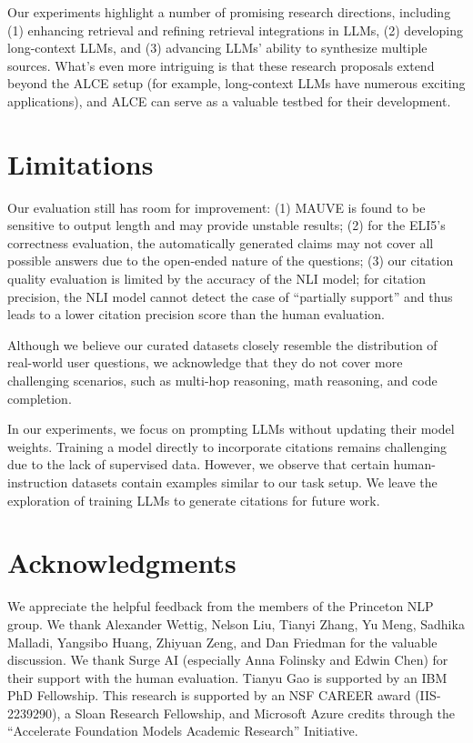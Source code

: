 \documentclass[11pt]{article}
\newcommand{\citeeval}{ALCE}
\begin{document}
Our experiments highlight a number of promising research directions, including
(1) enhancing retrieval and refining retrieval integrations in LLMs,
(2) developing long-context LLMs, and 
(3) advancing LLMs' ability to synthesize multiple sources.
What's even more intriguing is that  these research proposals extend beyond the \citeeval{} setup (for example, long-context LLMs have numerous exciting applications), and
\citeeval{} can serve as a valuable testbed for their development.


\section*{Limitations}

 

Our evaluation still has room for improvement:
(1) MAUVE is found to be sensitive to output length and may provide unstable results;
(2) for the ELI5's correctness evaluation, the automatically generated claims may not cover all possible answers due to the open-ended nature of the questions;
(3) our citation quality evaluation is limited by the accuracy of the NLI model; for citation precision, the NLI model cannot detect the case of ``partially support'' and thus
leads to a lower citation precision score than the human evaluation.

Although we believe our curated datasets closely resemble the distribution of real-world user questions,
we acknowledge that they do not cover more challenging scenarios, such as
multi-hop reasoning, math reasoning, and code completion.


In our experiments, we focus on prompting LLMs without updating their model weights.
Training a model directly to incorporate citations remains challenging due to the lack of supervised data.
However, we observe that certain human-instruction datasets
contain examples similar to our task setup.
We leave the exploration of training LLMs to generate citations for future work.



\section*{Acknowledgments}

We appreciate the helpful feedback from the members of the Princeton NLP group. %
We thank Alexander Wettig, Nelson Liu, Tianyi Zhang, Yu Meng, Sadhika Malladi, Yangsibo Huang, Zhiyuan Zeng, and Dan  Friedman for the valuable discussion.
We thank Surge AI (especially Anna Folinsky and Edwin Chen)
for their support with the human evaluation.
Tianyu Gao is supported by an IBM PhD Fellowship. 
This research is supported by an NSF CAREER award (IIS-2239290), a Sloan Research Fellowship, 
and Microsoft Azure credits through the ``Accelerate Foundation Models Academic Research'' Initiative. 
\end{document}
